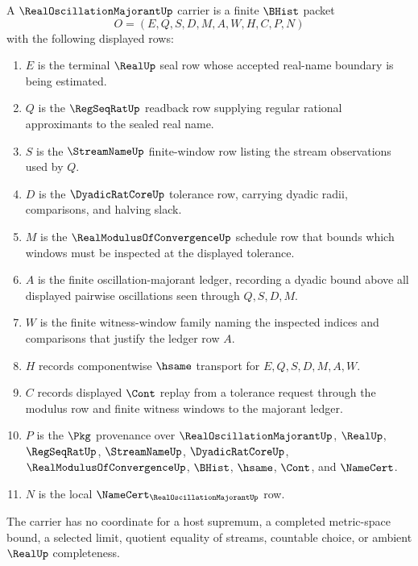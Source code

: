 \begin{definition}
\label{def:real-oscillation-majorant-carrier}
A $\RealOscillationMajorantUp$ carrier is a finite $\BHist$ packet
$$
O=(E,Q,S,D,M,A,W,H,C,P,N)
$$
with the following displayed rows:
\begin{enumerate}
\item $E$ is the terminal $\RealUp$ seal row whose accepted real-name boundary is being estimated.
\item $Q$ is the $\RegSeqRatUp$ readback row supplying regular rational approximants to the sealed real name.
\item $S$ is the $\StreamNameUp$ finite-window row listing the stream observations used by $Q$.
\item $D$ is the $\DyadicRatCoreUp$ tolerance row, carrying dyadic radii, comparisons, and halving slack.
\item $M$ is the $\RealModulusOfConvergenceUp$ schedule row that bounds which windows must be inspected at the displayed tolerance.
\item $A$ is the finite oscillation-majorant ledger, recording a dyadic bound above all displayed pairwise oscillations seen through $Q,S,D,M$.
\item $W$ is the finite witness-window family naming the inspected indices and comparisons that justify the ledger row $A$.
\item $H$ records componentwise $\hsame$ transport for $E,Q,S,D,M,A,W$.
\item $C$ records displayed $\Cont$ replay from a tolerance request through the modulus row and finite witness windows to the majorant ledger.
\item $P$ is the $\Pkg$ provenance over $\RealOscillationMajorantUp$, $\RealUp$, $\RegSeqRatUp$, $\StreamNameUp$, $\DyadicRatCoreUp$, $\RealModulusOfConvergenceUp$, $\BHist$, $\hsame$, $\Cont$, and $\NameCert$.
\item $N$ is the local $\NameCert_{\RealOscillationMajorantUp}$ row.
\end{enumerate}
The carrier has no coordinate for a host supremum, a completed metric-space bound, a selected limit, quotient equality of streams, countable choice, or ambient $\RealUp$ completeness.
\end{definition}

